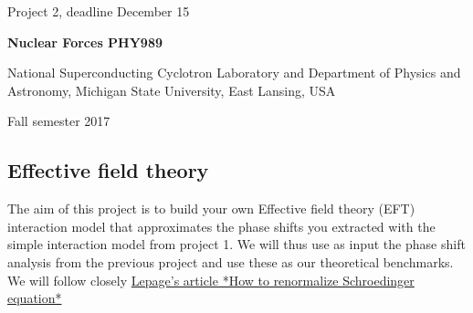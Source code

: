 \documentclass[%
oneside,                 %
final,                   %
10pt]{article}
\begin{document}

\newcommand{\exercisesection}[1]{\subsection*{#1}}






\thispagestyle{empty}

\begin{center}
{\LARGE\bf
\begin{spacing}{1.25}
Project 2, deadline  December 15
\end{spacing}
}
\end{center}


\begin{center}
{\bf Nuclear Forces PHY989}
\end{center}

    \begin{center}
\centerline{{\small National Superconducting Cyclotron Laboratory and Department of Physics and Astronomy, Michigan State University, East Lansing, USA}}
\end{center}
    

\begin{center}
Fall semester 2017
\end{center}

\vspace{1cm}


\subsection*{Effective field theory}

The aim of this project is to build your own Effective field theory (EFT) interaction model that approximates the phase shifts you extracted with the simple interaction model from project 1. We will thus use as input the phase shift analysis from the previous project and use these as our theoretical benchmarks.
We will follow closely \href{{https://arxiv.org/abs/nucl-th/9706029}}{Lepage's article *How to renormalize Schroedinger equation*}
\end{document}
